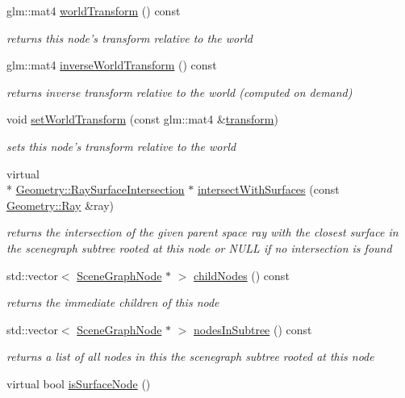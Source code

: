 \begin{DoxyCompactItemize}
glm\-::mat4 \hyperlink{classmotorcar_1_1SceneGraphNode_a3e7fba2add3f63a65f31996f0ce9c9bf}{world\-Transform} () const 
\begin{DoxyCompactList}\small\item\em returns this node's transform relative to the world \end{DoxyCompactList}\item 
glm\-::mat4 \hyperlink{classmotorcar_1_1SceneGraphNode_a10e4fd743e891cef676435c5f5d5467d}{inverse\-World\-Transform} () const 
\begin{DoxyCompactList}\small\item\em returns inverse transform relative to the world (computed on demand) \end{DoxyCompactList}\item 
void \hyperlink{classmotorcar_1_1SceneGraphNode_ac1a30cbe4af18133b19e6f852c33e30a}{set\-World\-Transform} (const glm\-::mat4 \&\hyperlink{classmotorcar_1_1SceneGraphNode_ad96e79fdd739ac8223a3128003be391a}{transform})
\begin{DoxyCompactList}\small\item\em sets this node's transform relative to the world \end{DoxyCompactList}\item 
virtual \\*
\hyperlink{structmotorcar_1_1Geometry_1_1RaySurfaceIntersection}{Geometry\-::\-Ray\-Surface\-Intersection} $\ast$ \hyperlink{classmotorcar_1_1SceneGraphNode_ac268b171317430368fcc7733eab05ae6}{intersect\-With\-Surfaces} (const \hyperlink{structmotorcar_1_1Geometry_1_1Ray}{Geometry\-::\-Ray} \&ray)
\begin{DoxyCompactList}\small\item\em returns the intersection of the given parent space ray with the closest surface in the scenegraph subtree rooted at this node or N\-U\-L\-L if no intersection is found \end{DoxyCompactList}\item 
std\-::vector$<$ \hyperlink{classmotorcar_1_1SceneGraphNode}{Scene\-Graph\-Node} $\ast$ $>$ \hyperlink{classmotorcar_1_1SceneGraphNode_a9a0c649390da0918afd58805192ccdca}{child\-Nodes} () const 
\begin{DoxyCompactList}\small\item\em returns the immediate children of this node \end{DoxyCompactList}\item 
std\-::vector$<$ \hyperlink{classmotorcar_1_1SceneGraphNode}{Scene\-Graph\-Node} $\ast$ $>$ \hyperlink{classmotorcar_1_1SceneGraphNode_aa7ac1c085afbe0fb0b9d5cd578a8c4ef}{nodes\-In\-Subtree} () const 
\begin{DoxyCompactList}\small\item\em returns a list of all nodes in this the scenegraph subtree rooted at this node \end{DoxyCompactList}\item 
virtual bool \hyperlink{classmotorcar_1_1SceneGraphNode_a161d962f2594172ea0f58a9e6167703b}{is\-Surface\-Node} ()
\end{DoxyCompactItemize}
